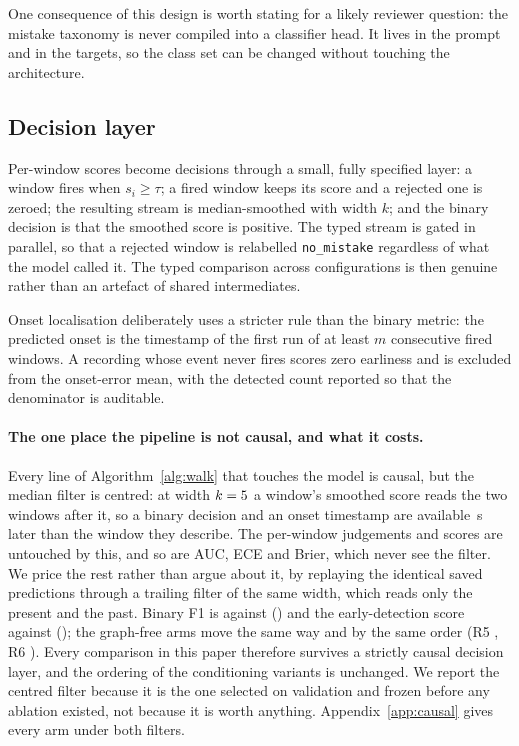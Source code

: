 \documentclass[10pt,twocolumn]{article}
\begin{document}
One consequence of this design is worth stating for a likely reviewer question:
the mistake taxonomy is never compiled into a classifier head. It lives in the
prompt and in the targets, so the class set can be changed without touching the
architecture.

\subsection{Decision layer}
\label{sec:decision}

Per-window scores become decisions through a small, fully specified layer: a
window fires when $s_i\ge\tau$; a fired window keeps its score and a rejected one
is zeroed; the resulting stream is median-smoothed with width $k$; and the binary
decision is that the smoothed score is positive. The typed stream is gated in
parallel, so that a rejected window is relabelled \texttt{no\_mistake} regardless
of what the model called it. The typed comparison across configurations is then
genuine rather than an artefact of shared intermediates.

Onset localisation deliberately uses a stricter rule than the binary metric: the
predicted onset is the timestamp of the first run of at least $m$ consecutive
fired windows. A recording whose event never fires scores zero earliness and is
excluded from the onset-error mean, with the detected count reported so that the
denominator is auditable.

\paragraph{The one place the pipeline is not causal, and what it costs.}
Every line of Algorithm~\ref{alg:walk} that touches the model is causal, but the
median filter is centred: at width $k=5{}$ a window's smoothed score reads
the two windows after it, so a binary decision and an onset timestamp are
available \csLook{}\,s later than the window they describe. The per-window
judgements and scores are untouched by this, and so are AUC, ECE and Brier,
which never see the filter. We price the rest rather than argue about it, by
replaying the identical saved predictions through a trailing filter of the same
width, which reads only the present and the past. Binary F1 is \csF{} against
\resF{} (\csDelta{}) and the early-detection score \csEDS{} against \resEDS{}
(\csEdsDelta{}); the graph-free arms move the same way and by the same order
(R5 \csNgF{}, R6 \csNtF{}). Every comparison in this paper therefore survives a
strictly causal decision layer, and the ordering of the conditioning variants is
unchanged. We report the centred filter because it is the one selected on
validation and frozen before any ablation existed, not because it is worth
anything. Appendix~\ref{app:causal} gives every arm under both filters.
\end{document}
